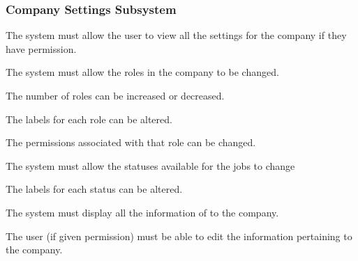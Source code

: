 \documentclass{article}
\begin{document}
	\subsubsection*{Company Settings Subsystem}	
	\begin{list}{R.}{}
		\item The system must allow the user to view all the settings for the company if they have permission.
		\item The system must allow the roles in the company to be changed.
		\begin{list}{R.}{}
			\item The number of roles can be increased or decreased.
			\item The labels for each role can be altered.
			\item The permissions associated with that role can be changed.
		\end{list}
		\item The system must allow the statuses available for the jobs to change
		\begin{list}{R.}{}
			\item The labels for each status can be altered.
		\end{list}
		\item The system must display all the information of to the company.
		\item The user (if given permission) must be able to edit the information pertaining to the company.
	\end{list}
	
\end{document}
